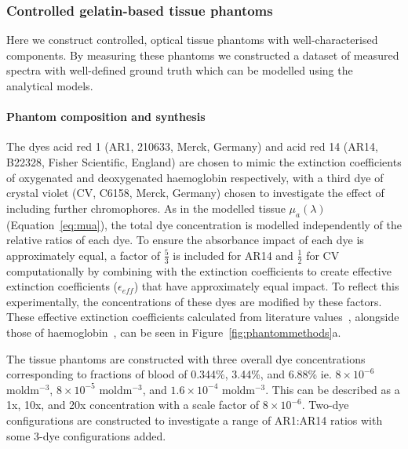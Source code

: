 \subsubsection{Controlled gelatin-based tissue phantoms}\label{sec:methodsphantoms}
Here we construct controlled, optical tissue phantoms with well-characterised components. By measuring these phantoms we constructed a dataset of measured spectra with well-defined ground truth which can be modelled using the analytical models.

\paragraph{Phantom composition and synthesis}\label{sec:methodsphantomcomposition}

The dyes acid red 1 (AR1, 210633, Merck, Germany) and acid red 14 (AR14, B22328, Fisher Scientific, England) are chosen to mimic the extinction coefficients of oxygenated and deoxygenated haemoglobin respectively, with a third dye of crystal violet (CV, C6158, Merck, Germany) chosen to investigate the effect of including further chromophores. As in the modelled tissue $\mu_a(\lambda)$ (Equation~\eqref{eq:mua}), the total dye concentration is modelled independently of the relative ratios of each dye. To ensure the absorbance impact of each dye is approximately equal, a factor of $\frac{5}{3}$ is included for AR14 and $\frac{1}{2}$ for CV computationally by combining with the extinction coefficients to create effective extinction coefficients ($\epsilon_{eff}$) that have approximately equal impact. To reflect this experimentally, the concentrations of these dyes are modified by these factors. These effective extinction coefficients calculated from literature values~\citep{Taniguchi2018}, alongside those of haemoglobin~\citep{Prahl1998}, can be seen in Figure~\ref{fig:phantommethods}a. 

The tissue phantoms are constructed with three overall dye concentrations corresponding to fractions of blood of 0.344\%, 3.44\%, and 6.88\% ie. $8\times10^{-6}$ moldm$^{-3}$, $8\times10^{-5}$ moldm$^{-3}$, and $1.6\times10^{-4}$ moldm$^{-3}$. This can be described as a 1x, 10x, and 20x concentration with a scale factor of $8\times10^{-6}$.
Two-dye configurations are constructed to investigate a range of AR1:AR14 ratios with some 3-dye configurations added. 

